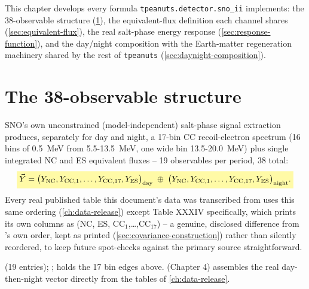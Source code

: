 \label{ch:detector-implementation}

This chapter develops every formula \texttt{tpeanuts.detector.sno\_ii}
implements: the 38-observable structure (\cref{sec:38-observables}), the
equivalent-flux definition each channel shares
(\cref{sec:equivalent-flux}), the real salt-phase energy response
(\cref{sec:response-function}), and the day/night composition with the
Earth-matter regeneration machinery shared by the rest of \texttt{tpeanuts}
(\cref{sec:daynight-composition}).

\section{The 38-observable structure}
\label{sec:38-observables}


\begin{theorybox}
SNO's own unconstrained (model-independent) salt-phase signal extraction
produces, separately for day and night, a 17-bin CC recoil-electron
spectrum (16 bins of 0.5~MeV from 5.5-13.5~MeV, one wide bin
13.5-20.0~MeV) plus single integrated NC and ES equivalent fluxes -- 19
observables per period, 38 total:
\begin{equation}
  \keyresult{\vec Y = \bigl(Y_{\rm NC}, Y_{{\rm CC},1},\dots,Y_{{\rm CC},17}, Y_{\rm ES}\bigr)_{\rm day}
    \;\oplus\;
    \bigl(Y_{\rm NC}, Y_{{\rm CC},1},\dots,Y_{{\rm CC},17}, Y_{\rm ES}\bigr)_{\rm night}.}
  \label{eq:observable-vector}
\end{equation}
Every real published table this document's data was transcribed from uses
this same ordering (\cref{ch:data-release}) except Table XXXIV specifically,
which prints its own columns as (NC, ES, CC$_1$,\dots,CC$_{17}$) -- a
genuine, disclosed difference from 's own
order, kept as printed (\cref{sec:covariance-construction}) rather than
silently reordered, to keep future spot-checks against the primary source
straightforward.
\end{theorybox}

\begin{implbox}
 (19 entries);
;  holds the 17
bin edges above.  (Chapter 4)
assembles the real day-then-night  vector
directly from the tables of \cref{ch:data-release}.
\end{implbox}

